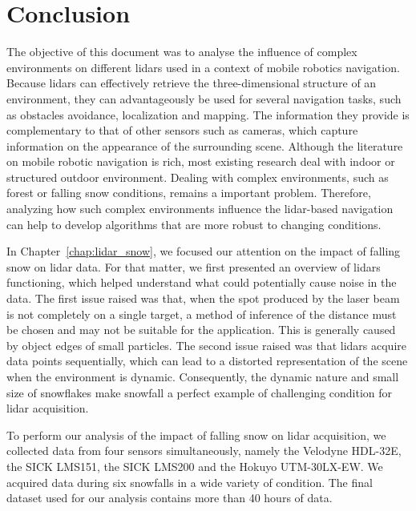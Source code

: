 \chapter*{Conclusion}

The objective of this document was to analyse the influence of complex environments on different \gls*{lidar}s used in a context of mobile robotics navigation. Because \gls*{lidar}s can effectively retrieve the three-dimensional structure of an environment, they can advantageously be used for several navigation tasks, such as obstacles avoidance, localization and mapping. The information they provide is complementary to that of other sensors such as cameras, which capture information on the appearance of the surrounding scene. Although the literature on mobile robotic navigation is rich, most existing research deal with indoor or structured outdoor environment. Dealing with complex environments, such as forest or falling snow conditions, remains a important problem. Therefore, analyzing how such complex environments influence the \gls*{lidar}-based navigation can help to develop algorithms that are more robust to changing conditions.

In Chapter~\ref{chap:lidar_snow}, we focused our attention on the impact of falling snow on \gls*{lidar} data. For that matter, we first presented an overview of \gls*{lidar}s functioning, which helped understand what could potentially cause noise in the data. The first issue raised was that, when the spot produced by the laser beam is not completely on a single target, a method of inference of the distance must be chosen and may not be suitable for the application. This is generally caused by object edges of small particles. The second issue raised was that \gls*{lidar}s acquire data points sequentially, which can lead to a distorted representation of the scene when the environment is dynamic. Consequently, the dynamic nature and small size of snowflakes make snowfall a perfect example of challenging condition for \gls*{lidar} acquisition.

To perform our analysis of the impact of falling snow on \gls*{lidar} acquisition, we collected data from four sensors simultaneously, namely the Velodyne HDL-32E, the SICK LMS151, the SICK LMS200 and the Hokuyo UTM-30LX-EW. We acquired data during six snowfalls in a wide variety of condition. The final dataset used for our analysis contains more than 40 hours of data. 

